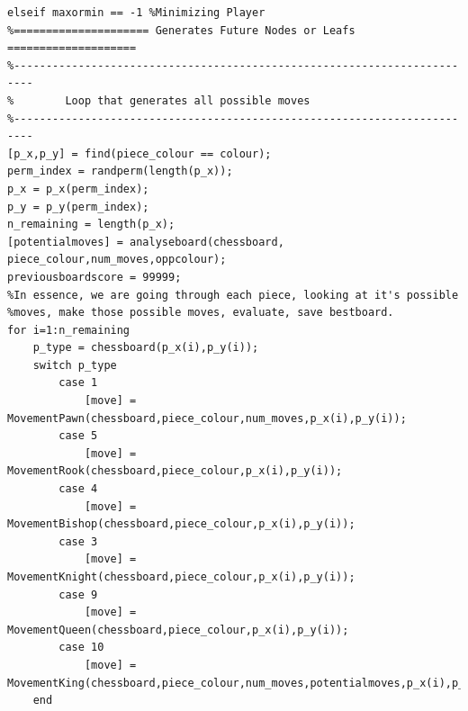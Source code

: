 \documentclass[11pt,a4paper]{article}
\begin{document}
\begin{lstlisting}
elseif maxormin == -1 %Minimizing Player
%===================== Generates Future Nodes or Leafs ====================
%-------------------------------------------------------------------------
%        Loop that generates all possible moves
%-------------------------------------------------------------------------
[p_x,p_y] = find(piece_colour == colour);
perm_index = randperm(length(p_x));
p_x = p_x(perm_index);
p_y = p_y(perm_index);
n_remaining = length(p_x);
[potentialmoves] = analyseboard(chessboard, piece_colour,num_moves,oppcolour);
previousboardscore = 99999;
%In essence, we are going through each piece, looking at it's possible
%moves, make those possible moves, evaluate, save bestboard.
for i=1:n_remaining
    p_type = chessboard(p_x(i),p_y(i));
    switch p_type
        case 1
            [move] = MovementPawn(chessboard,piece_colour,num_moves,p_x(i),p_y(i));
        case 5
            [move] = MovementRook(chessboard,piece_colour,p_x(i),p_y(i)); 
        case 4
            [move] = MovementBishop(chessboard,piece_colour,p_x(i),p_y(i));
        case 3
            [move] = MovementKnight(chessboard,piece_colour,p_x(i),p_y(i));
        case 9
            [move] = MovementQueen(chessboard,piece_colour,p_x(i),p_y(i));
        case 10
            [move] = MovementKing(chessboard,piece_colour,num_moves,potentialmoves,p_x(i),p_y(i));
    end


\end{lstlisting}
\end{document}
